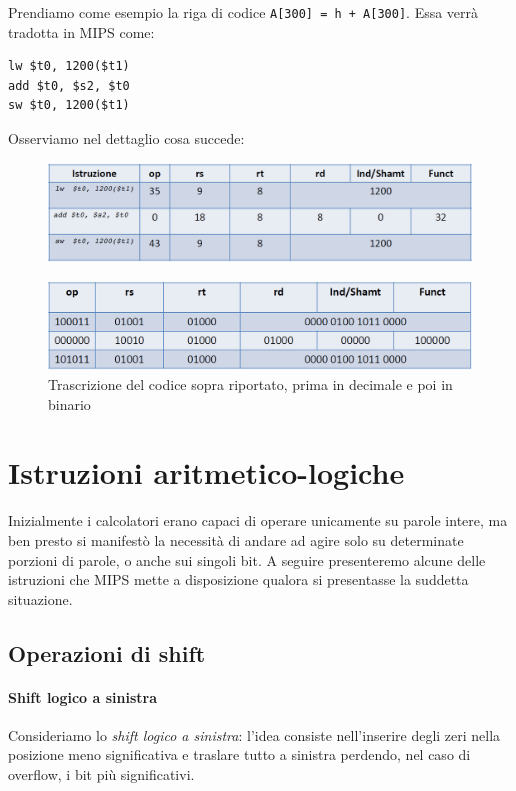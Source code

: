 \documentclass[class=book, crop=false, oneside]{standalone}
\begin{document}
Prendiamo come esempio la riga di codice \texttt{A[300] = h + A[300]}. Essa verrà tradotta in MIPS come:
\begin{verbatim}
lw $t0, 1200($t1)
add $t0, $s2, $t0
sw $t0, 1200($t1)
\end{verbatim}
Osserviamo nel dettaglio cosa succede:
\begin{figure}[H]
	\centering
	\includegraphics[width=1\textwidth,keepaspectratio]{nat.png}
\end{figure}
\begin{figure}[H]
	\centering
	\includegraphics[width=1\textwidth,keepaspectratio]{bin.png}
	\caption{Trascrizione del codice sopra riportato, prima in decimale e poi in binario}
\end{figure}

\section{Istruzioni aritmetico-logiche}

Inizialmente i calcolatori erano capaci di operare unicamente su parole intere, ma ben presto si manifestò la necessità di andare ad agire solo su determinate porzioni di parole, o anche sui singoli bit. A seguire presenteremo alcune delle istruzioni che MIPS mette a disposizione qualora si presentasse la suddetta situazione.

\subsection{Operazioni di shift}

\paragraph{Shift logico a sinistra}
Consideriamo lo \emph{shift logico a sinistra}: l'idea consiste nell'inserire degli zeri nella posizione meno significativa e traslare tutto a sinistra perdendo, nel caso di overflow, i bit più significativi.
\end{document}
